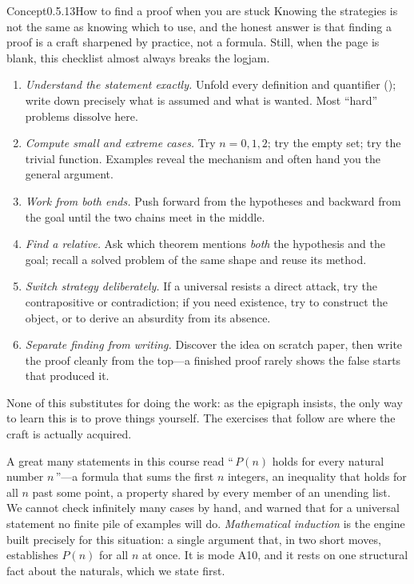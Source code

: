 \documentclass[main.tex]{subfiles}
\begin{document}
\begin{ObjL}{Concept}{0.5.13}{How to find a proof when you are stuck}
Knowing the strategies is not the same as knowing which to use, and the honest answer is that finding
a proof is a craft sharpened by practice, not a formula. Still, when the page is blank, this checklist
almost always breaks the logjam.
\begin{enumerate}[leftmargin=1.9em,label=\textnormal{(\arabic*)}]
  \item \emph{Understand the statement exactly.} Unfold every definition and quantifier
        (); write down precisely what is assumed and what is wanted. Most ``hard''
        problems dissolve here.
  \item \emph{Compute small and extreme cases.} Try $n=0,1,2$; try the empty set; try the trivial
        function. Examples reveal the mechanism and often hand you the general argument.
  \item \emph{Work from both ends.} Push forward from the hypotheses and backward from the goal until
        the two chains meet in the middle.
  \item \emph{Find a relative.} Ask which theorem mentions \emph{both} the hypothesis and the goal;
        recall a solved problem of the same shape and reuse its method.
  \item \emph{Switch strategy deliberately.} If a universal resists a direct attack, try the
        contrapositive or contradiction; if you need existence, try to construct the object, or to
        derive an absurdity from its absence.
  \item \emph{Separate finding from writing.} Discover the idea on scratch paper, then write the
        proof cleanly from the top---a finished proof rarely shows the false starts that produced it.
\end{enumerate}
None of this substitutes for doing the work: as the epigraph insists, the only way to learn
this is to prove things yourself. The exercises that follow are where the craft is actually acquired.
\end{ObjL}
\clearpage

\noindent A great many statements in this course read ``\,$P(n)$ holds for every natural number
$n$\,''---a formula that sums the first $n$ integers, an inequality that holds for all $n$ past some
point, a property shared by every member of an unending list. We cannot check infinitely many cases
by hand, and  warned that for a universal statement no finite pile of examples will do.
\emph{Mathematical induction} is the engine built precisely for this situation: a single argument
that, in two short moves, establishes $P(n)$ for all $n$ at once. It is mode \textsf{A10}, and it
rests on one structural fact about the naturals, which we state first.
\end{document}
